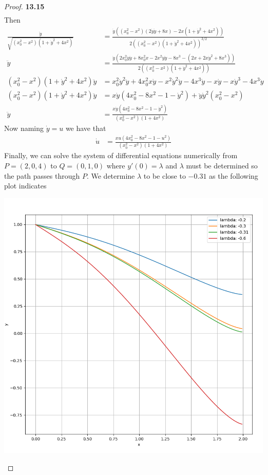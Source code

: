 \documentclass[11pt]{article}
\theoremstyle{definition}
\begin{document}
\begin{proof}{\textbf{13.15}}
\begin{align*}
    \end{align*}
    Then
    \begin{align*}
        \frac{\ddot y}{\sqrt{(x_0^2 - x^2)(1 + \dot y^2 + 4x^2)}} &= 
        \frac{\dot y((x_0^2 - x^2)(2\dot y\ddot y + 8x)-2x(1 + \dot y^2 + 4x^2))}
        {2((x_0^2 - x^2)(1 + \dot y^2 + 4x^2))^{3/2}}
        \\
        \ddot y &= 
        \frac{\dot y(2x_0^2\dot y\ddot y + 8x_0^2x -2x^2\dot y\ddot y - 8x^3
        -(2x + 2x\dot y^2 + 8x^3))}
        {2((x_0^2 - x^2)(1 + \dot y^2 + 4x^2))}
        \\ 
        (x_0^2 - x^2)(1 + \dot y^2 + 4x^2)\ddot y &= 
        x_0^2\dot y^2\ddot y + 4x_0^2x\dot y - x^2\dot y^2\ddot y - 4x^3\dot y
        -x\dot y - x\dot y^3 - 4x^3\dot y
        \\
        (x_0^2 - x^2)(1 + \dot y^2 + 4x^2)\ddot y &= 
        x\dot y(4x_0^2 - 8x^2 - 1 - \dot y^2) +
        \ddot y\dot y^2(x_0^2 - x^2)
        \\
        \ddot y &= 
        \frac{x\dot y(4x_0^2 - 8x^2 - 1 - \dot y^2)}
        {(x_0^2 - x^2)(1 + 4x^2)}
    \end{align*}
    Now naming $\dot y = u$ we have that
    \begin{align*}
        \dot u &= \frac{xu(4x_0^2 - 8x^2 - 1 - u^2)}{(x_0^2 - x^2)(1 + 4x^2)}
    \end{align*}
    Finally, we can solve the system of differential equations numerically
    from $P = (2, 0, 4)$ to $Q=(0, 1, 0)$ where $y'(0) = \lambda$ and $\lambda$
    must be determined so the path passes through $P$. We determine $\lambda$
    to be close to $-0.31$ as the following plot indicates
    \begin{center}
        \includegraphics[scale=0.5]{ch13-15.png}

\end{center}
\end{proof}
\end{document}
